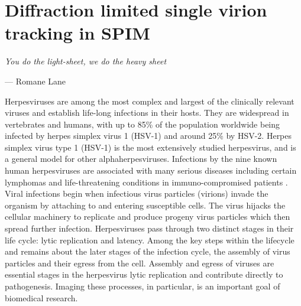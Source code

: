 \ifpdf
    \graphicspath{{Chapters/spt/Figs/Raster/}{Chapters/spt/Figs/PDF/}{Chapters/spt/Figs/}}
\else
    \graphicspath{{Chapters/spt/Figs/Vector/}{Chapters/spt/Figs/}}
\fi

\chapter{Diffraction limited single virion tracking in SPIM}\label{chapter:spt}

\epigraph{\emph{You do the light-sheet, we do the heavy sheet}}{--- Romane Lane}

Herpesviruses are among the most complex and largest of the clinically relevant viruses and establish life-long infections in their hosts.
They are widespread in vertebrates and humans, with up to 85\% of the population worldwide being infected by herpes simplex virus 1 (HSV-1) and around 25\% by HSV-2.
Herpes simplex virus type 1 (HSV-1) is the most extensively studied herpesvirus, and is a general model for other alphaherpesviruses.
Infections by the nine known human herpesviruses are associated with many serious diseases including certain lymphomas and life-threatening conditions in immuno-compromised patients \cite{[1]}.
Viral infections begin when infectious virus particles (virions) invade the organism by attaching to and entering susceptible cells.
The virus hijacks the cellular machinery to replicate and produce progeny virus particles which then spread further infection.
Herpesviruses pass through two distinct stages in their life cycle: lytic replication and latency.
Among the key steps within the lifecycle and remains about the later
stages of the infection cycle, the assembly of virus particles and their egress from the cell.
Assembly and egress of viruses are essential stages in the herpesvirus lytic replication and contribute directly to pathogenesis.
Imaging these processes, in particular, is an important goal of biomedical research.

